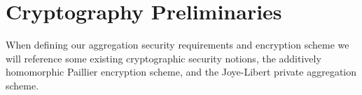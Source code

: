 \documentclass[10pt,letterpaper,oneside,twocolumn,journal]{IEEEtran}
\theoremstyle{definition}
\theoremstyle{definition}
\theoremstyle{remark}
\begin{document}
% 
%                                                                                                        
%                                                                                                        
%                                                                                                        
% 

\section{Cryptography Preliminaries} \label{sec:crypto_prelim}
When defining our aggregation security requirements and encryption scheme we will reference some existing cryptographic security notions, the additively homomorphic Paillier encryption scheme, and the Joye-Libert private aggregation scheme.

% 
% 
\end{document}
